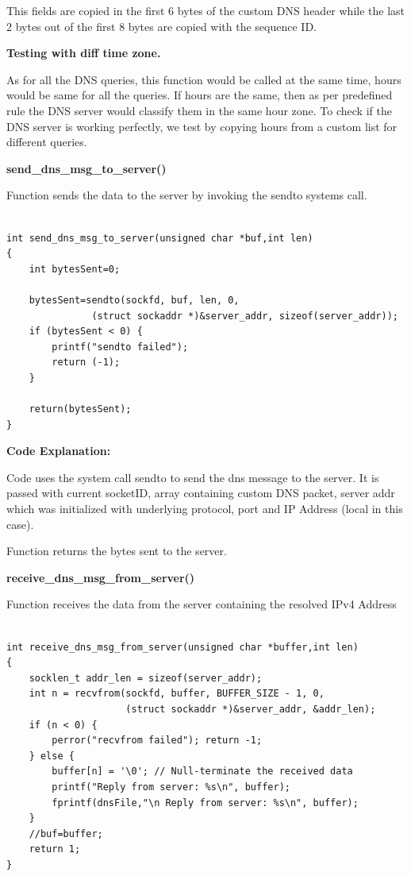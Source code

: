 \documentclass[12pt, a4paper]{report}
\begin{document}
This fields are copied in the first 6 bytes of the custom DNS header while the last 2 bytes out of the first 8 bytes are copied with the sequence ID.

\textbf{Testing with diff time zone.}

As for all the DNS queries, this function would be called at the same time, hours would be same for all the queries.
If hours are the same, then as per predefined rule the DNS server would classify them in the same hour zone. To check if the DNS server is working perfectly, we test by copying hours from a custom list for different queries.

\vspace{2em}

\textbf{send\_dns\_msg\_to\_server()}

Function sends the data to the server by invoking the sendto systems call.

\begin{lstlisting}[caption={}]

int send_dns_msg_to_server(unsigned char *buf,int len)
{
    int bytesSent=0;

    bytesSent=sendto(sockfd, buf, len, 0,
               (struct sockaddr *)&server_addr, sizeof(server_addr));
    if (bytesSent < 0) {
        printf("sendto failed");
        return (-1);
    }

    return(bytesSent);
}
\end{lstlisting}

\textbf{Code Explanation: }

Code uses the system call sendto to send the dns message to the server. It is passed with current socketID, array containing custom DNS packet, server addr which was initialized with underlying protocol, port and IP Address (local in this case).

Function returns the bytes sent to the server.


\textbf{receive\_dns\_msg\_from\_server()}

Function receives the data from the server containing the resolved IPv4 Address

\begin{lstlisting}[caption={}]

int receive_dns_msg_from_server(unsigned char *buffer,int len)
{
    socklen_t addr_len = sizeof(server_addr);
    int n = recvfrom(sockfd, buffer, BUFFER_SIZE - 1, 0,
                     (struct sockaddr *)&server_addr, &addr_len);
    if (n < 0) {
        perror("recvfrom failed"); return -1;
    } else {
        buffer[n] = '\0'; // Null-terminate the received data
        printf("Reply from server: %s\n", buffer);
        fprintf(dnsFile,"\n Reply from server: %s\n", buffer);
    }
    //buf=buffer;
    return 1;
}

    
\end{lstlisting}
\end{document}
